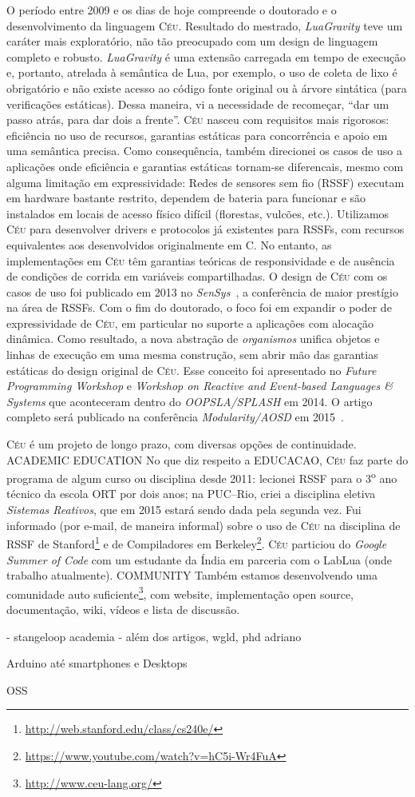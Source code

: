 \documentclass[12pt,a4paper]{article}
\newcommand{\CEU}{\textsc{C\'{e}u}\xspace}
\newcommand{\GVT}{\emph{LuaGravity}\xspace}
\begin{document}
O período entre 2009 e os dias de hoje compreende o doutorado e o 
desenvolvimento da linguagem \CEU.
%
Resultado do mestrado, \GVT teve um caráter mais exploratório, não tão 
preocupado com um design de linguagem completo e robusto.
%
\GVT é uma extensão carregada em tempo de execução e, portanto,
atrelada à semântica de Lua, por exemplo, o uso de coleta de lixo é obrigatório 
e não existe acesso ao código fonte original ou à árvore sintática (para 
verificações estáticas).
%
Dessa maneira, vi a necessidade de recomeçar, ``dar um passo atrás, para dar 
dois a frente''.
%
\CEU nasceu com requisitos mais rigorosos: eficiência no uso de recursos, 
garantias estáticas para concorrência e apoio em uma semântica precisa.
%
Como consequência, também direcionei os casos de uso a aplicações onde
eficiência e garantias estáticas tornam-se diferencais, mesmo com alguma 
limitação em expressividade:
Redes de sensores sem fio (RSSF) executam em hardware bastante restrito, 
dependem de bateria para funcionar e são instalados em locais de acesso físico 
difícil (florestas, vulcões, etc.).
%
Utilizamos \CEU para desenvolver drivers e protocolos já existentes para RSSFs, 
com recursos equivalentes aos desenvolvidos originalmente em C.
No entanto, as implementações em \CEU têm garantias teóricas de responsividade 
e de ausência de condições de corrida em variáveis compartilhadas.
%
O design de \CEU com os casos de uso foi publicado em 2013 no 
\emph{SenSys}~\cite{ceu.sensys13}, a conferência de maior prestígio na área de 
RSSFs.
%
Com o fim do doutorado, o foco foi em expandir o poder de expressividade de 
\CEU, em particular no suporte a aplicações com alocação dinâmica.
Como resultado, a nova abstração de \emph{organismos} unifica objetos e linhas 
de execução em uma mesma construção, sem abrir mão das garantias estáticas do 
design original de \CEU.
%
Esse conceito foi apresentado no \emph{Future Programming Workshop} e 
\emph{Workshop on Reactive and Event-based Languages \& Systems} que 
aconteceram dentro do \emph{OOPSLA/SPLASH} em 2014.
O artigo completo será publicado na conferência \emph{Modularity/AOSD} em 
2015~\cite{ceu.mod15}.

\CEU é um projeto de longo prazo, com diversas opções de continuidade.
%
ACADEMIC
%
EDUCATION
No que diz respeito a EDUCACAO, \CEU faz parte do programa de algum curso ou 
disciplina desde 2011:
lecionei RSSF para o 3\textsuperscript{o} ano técnico da escola ORT por dois 
anos;
na PUC--Rio, criei a disciplina eletiva \emph{Sistemas Reativos}, que em 2015 
estará sendo dada pela segunda vez.
%
Fui informado (por e-mail, de maneira informal) sobre o uso de \CEU na 
disciplina de RSSF de 
Stanford\footnote{\url{http://web.stanford.edu/class/cs240e/}} e de 
Compiladores em 
Berkeley\footnote{\url{https://www.youtube.com/watch?v=hC5i-Wr4FuA}}.
%
\CEU particiou do \emph{Google Summer of Code} com um estudante da Índia em 
parceria com o LabLua (onde trabalho atualmente).
%
COMMUNITY
Também estamos desenvolvendo uma comunidade auto 
suficiente\footnote{\url{http://www.ceu-lang.org/}}, com website, implementação 
open source, documentação, wiki, vídeos e lista de discussão.
%



- stangeloop
academia
    - além dos artigos, wgld, phd adriano

Arduino até smartphones e Desktops

OSS



\end{document}

